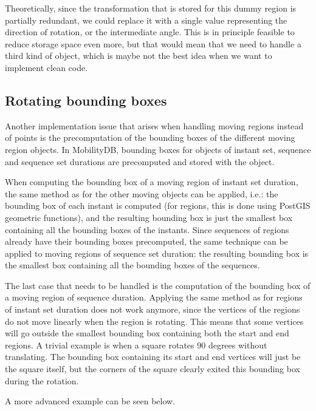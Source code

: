 	Theoretically, since the transformation that is stored for this dummy region is partially redundant, we could replace it with a single value representing the direction of rotation, or the intermediate angle. This is in principle feasible to reduce storage space even more, but that would mean that we need to handle a third kind of object, which is maybe not the best idea when we want to implement clean code. 

	\subsection{Rotating bounding boxes}
	
	Another implementation issue that arises when handling moving regions instead of points is the precomputation of the bounding boxes of the different moving region objects. In MobilityDB, bounding boxes for objects of instant set, sequence and sequence set durations are precomputed and stored with the object. 
	
	When computing the bounding box of a moving region of instant set duration, the same method as for the other moving objects can be applied, i.e.: the bounding box of each instant is computed (for regions, this is done using PostGIS geometric functions), and the resulting bounding box is just the smallest box containing all the bounding boxes of the instants. Since sequences of regions already have their bounding boxes precomputed, the same technique can be applied to moving regions of sequence set duration: the resulting bounding box is the smallest box containing all the bounding boxes of the sequences.
	
	
	The last case that needs to be handled is the computation of the bounding box of a moving region of sequence duration. Applying the same method as for regions of instant set duration does not work anymore, since the vertices of the regions do not move linearly when the region is rotating. This means that some vertices will go outside the smallest bounding box containing both the start and end regions. A trivial example is when a square rotates 90 degrees without translating. The bounding box containing its start and end vertices will just be the square itself, but the corners of the square clearly exited this bounding box during the rotation. 
	
	A more advanced example can be seen below.
	
	
